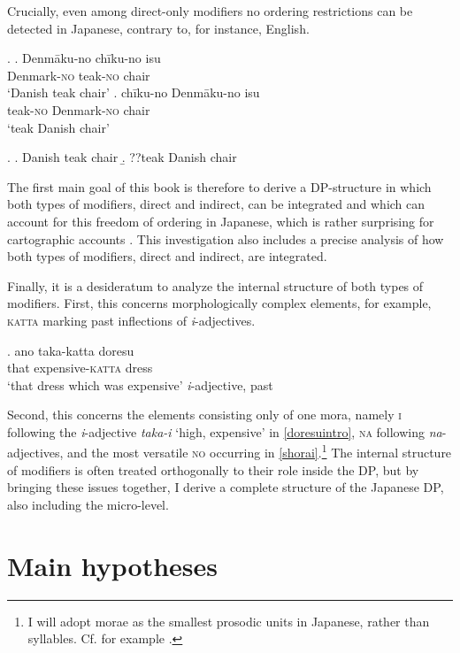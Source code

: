 Crucially, even among direct-only modifiers no ordering restrictions can be detected in Japanese, contrary to, for instance, English.

\ex. \ag. Denmāku-no chīku-no isu\\
Denmark-\textsc{no} teak-\textsc{no} chair\\
`Danish teak chair' \label{denmaku2}
\bg. chīku-no Denmāku-no isu\\
teak-\textsc{no} Denmark-\textsc{no} chair\\
`teak Danish chair' \label{denmaku3}

\ex. \label{danish english} \a. Danish teak chair
\b. ??teak Danish chair

\newpage
The first main goal of this book is therefore to derive a DP-structure in which both types of modifiers, direct and indirect, can be integrated and which can account for this freedom of ordering in Japanese, which is rather surprising for cartographic accounts \citep{cinque:2010:adj, cinque:2017:micro}. This investigation also includes a precise analysis of how both types of modifiers, direct and indirect, are integrated.

Finally, it is a desideratum to analyze the internal structure of both types of modifiers. First, this concerns morphologically complex elements, for example, \textsc{katta} marking past inflections of \textit{i}-adjectives.

\exg. ano taka-katta doresu\\
that expensive-\textsc{katta} dress\\
`that dress which was expensive' \null \hfill \textit{i}-adjective, past \label{taka-kattaoben}

Second, this concerns the elements consisting only of one mora, namely \textsc{i} following the \textit{i}-adjective \textit{taka-i} `high, expensive’ in \ref{doresuintro}, \textsc{na} following \textit{na}-adjectives, and the most versatile \textsc{no} occurring in \ref{shorai}.\footnote{I will adopt morae as the smallest prosodic units in Japanese, rather than syllables. Cf. for example \citet{kubozono:2005:rendaku, ito:2015:word}.} The internal structure of modifiers is often treated orthogonally to their role inside the DP, but by bringing these issues together, I derive a complete structure of the Japanese DP, also including the micro-level.

\section{Main hypotheses}

